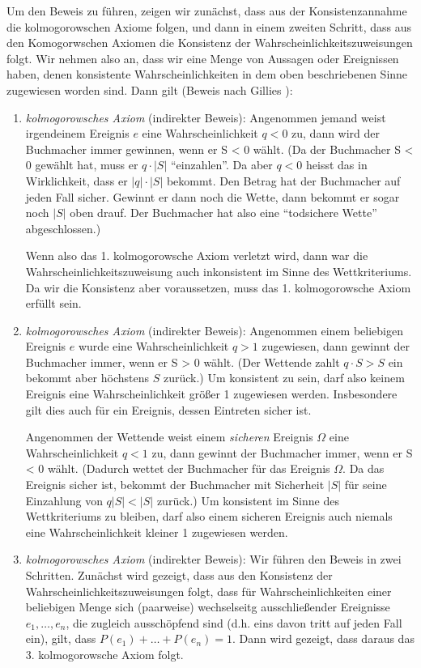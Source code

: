 Um den Beweis zu führen, zeigen wir zunächst, dass aus der Konsistenzannahme die
kolmogorowschen Axiome folgen, und dann in einem zweiten Schritt, dass aus den
Komogorwschen Axiomen die Konsistenz der Wahrscheinlichkeitszuweisungen folgt.
Wir nehmen also an, dass wir
eine Menge von Aussagen oder Ereignissen haben, denen konsistente Wahrscheinlichkeiten 
in dem oben beschriebenen Sinne zugewiesen
worden sind. Dann gilt (Beweis nach Gillies \cite[S. 60ff.]{gillies:2000}):
\begin{enumerate}
  \item {\em kolmogorowsches Axiom} (indirekter Beweis): Angenommen jemand
  weist irgendeinem Ereignis $e$ eine Wahrscheinlichkeit $q < 0$ zu, dann 
  wird der Buchmacher immer gewinnen, wenn er S < 0 wählt. (Da der Buchmacher
  S < 0 gewählt hat, muss er $q\cdot |S|$ "`einzahlen"'. Da aber $q < 0$ heisst
  das in Wirklichkeit, dass er $|q|\cdot |S|$ bekommt. Den Betrag hat der
  Buchmacher auf jeden Fall sicher. Gewinnt er dann noch die Wette, dann bekommt er sogar noch $|S|$
  oben drauf. Der Buchmacher hat also eine "`todsichere Wette"' abgeschlossen.)
  
  Wenn also das 1. kolmogorowsche Axiom verletzt wird, dann war die
  Wahrscheinlichkeitszuweisung auch inkonsistent im Sinne des Wettkriteriums.
  Da wir die Konsistenz aber voraussetzen, muss das 1. kolmogorowsche Axiom
  erfüllt sein.
 
  \item {\em kolmogorowsches Axiom} (indirekter Beweis): Angenommen einem
  beliebigen Ereignis $e$ wurde eine Wahrscheinlichkeit $q > 1$
  zugewiesen, dann gewinnt der Buchmacher immer, wenn er S > 0 wählt. (Der
  Wettende zahlt $q\cdot S > S$ ein bekommt aber höchstens $S$ zurück.)
  Um konsistent zu sein, darf also keinem Ereignis eine Wahrscheinlichkeit
  größer 1 zugewiesen werden. Insbesondere gilt dies auch für ein Ereignis,
  dessen Eintreten sicher ist.
  
  Angenommen der Wettende weist einem {\em sicheren} Ereignis $\Omega$ eine
  Wahrscheinlichkeit $q < 1$ zu, dann gewinnt der Buchmacher immer, wenn er
  S < 0 wählt. (Dadurch wettet der Buchmacher für das Ereignis $\Omega$. Da das
  Ereignis sicher ist, bekommt der Buchmacher mit Sicherheit $|S|$ für seine
  Einzahlung von $q|S| < |S|$ zurück.) Um konsistent im Sinne des
  Wettkriteriums zu bleiben, darf also einem sicheren Ereignis auch niemals eine
  Wahrscheinlichkeit kleiner 1 zugewiesen werden.
  
  \item {\em kolmogorowsches Axiom} (indirekter Beweis): Wir führen
  den Beweis in zwei Schritten. Zunächst wird gezeigt, dass aus den Konsistenz
  der Wahrscheinlichkeitszuweisungen folgt, dass für Wahrscheinlichkeiten einer
  beliebigen Menge sich (paarweise) wechselseitg ausschließender Ereignisse
  $e_1,\ldots, e_n$, die zugleich ausschöpfend sind (d.h. eins davon tritt auf
  jeden Fall ein), gilt, dass $P(e_1) + \ldots + P(e_n) = 1$. Dann wird
  gezeigt, dass daraus das 3. kolmogorowsche Axiom folgt.
  

\end{enumerate}
